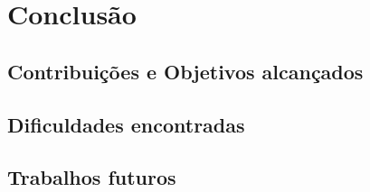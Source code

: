 \chapter{Conclusão}

\section{Contribuições e Objetivos alcançados}

\section{Dificuldades encontradas}

\section{Trabalhos futuros}